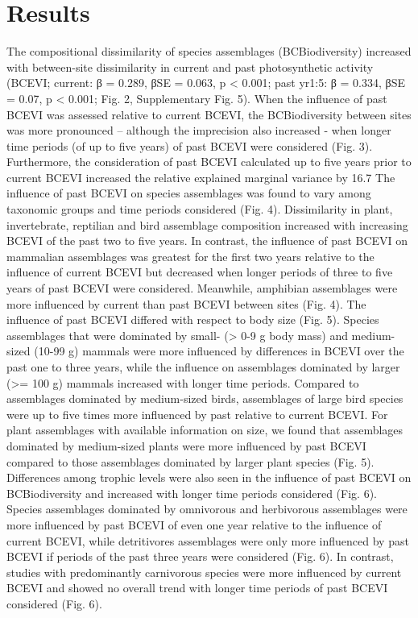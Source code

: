 {\section{Results}
The compositional dissimilarity of species assemblages (BCBiodiversity) increased with between-site dissimilarity in current and past photosynthetic activity (BCEVI; current: β = 0.289, βSE = 0.063, p < 0.001; past yr1:5:  β = 0.334, βSE = 0.07, p < 0.001; Fig. 2, Supplementary Fig. 5). When the influence of past BCEVI was assessed relative to current BCEVI, the BCBiodiversity between sites was more pronounced – although the imprecision also increased - when longer time periods (of up to five years) of past BCEVI were considered (Fig. 3). Furthermore, the consideration of past BCEVI calculated up to five years prior to current BCEVI increased the relative explained marginal variance by 16.7 %
	The influence of past BCEVI on species assemblages was found to vary among taxonomic groups and time periods considered (Fig. 4). Dissimilarity in plant, invertebrate, reptilian and bird assemblage composition increased with increasing BCEVI of the past two to five years. In contrast, the influence of past BCEVI on mammalian assemblages was greatest for the first two years relative to the influence of current BCEVI but decreased when longer periods of three to five years of past BCEVI were considered. Meanwhile, amphibian assemblages were more influenced by current than past BCEVI between sites (Fig. 4).
	The influence of past BCEVI differed with respect to body size (Fig. 5). Species assemblages that were dominated by small- (> 0-9 g body mass) and medium-sized (10-99 g) mammals were more influenced by differences in BCEVI over the past one to three years, while the influence on assemblages dominated by larger (>= 100 g) mammals increased with longer time periods. Compared to assemblages dominated by medium-sized birds, assemblages of large bird species were up to five times more influenced by past relative to current BCEVI. For plant assemblages with available information on size, we found that assemblages dominated by medium-sized plants were more influenced by past BCEVI compared to those assemblages dominated by larger plant species (Fig. 5). 
	Differences among trophic levels were also seen in the influence of past BCEVI on BCBiodiversity and increased with longer time periods considered (Fig. 6). Species assemblages dominated by omnivorous and herbivorous assemblages were more influenced by past BCEVI of even one year relative to the influence of current BCEVI, while detritivores assemblages were only more influenced by past BCEVI if periods of the past three years were considered (Fig. 6). In contrast, studies with predominantly carnivorous species were more influenced by current BCEVI and showed no overall trend with longer time periods of past BCEVI considered (Fig. 6). 

}
